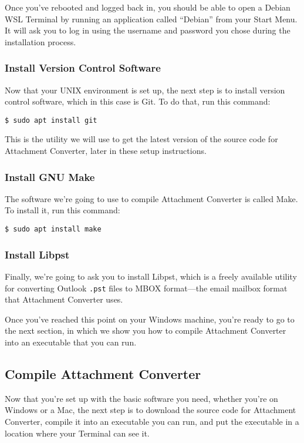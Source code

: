 \documentclass[11pt]{article}
\begin{document}
Once you've rebooted and logged back in, you should be able to open a
Debian WSL Terminal by running an application called ``Debian'' from
your Start Menu.  It will ask you to log in using the username and
password you chose during the installation process.

\subsubsection*{Install Version Control Software}
\label{sec:orgec6c2ca}

Now that your UNIX environment is set up, the next step is to install
version control software, which in this case is Git.  To do that, run
this command:

\begin{verbatim}
$ sudo apt install git
\end{verbatim}

This is the utility we will use to get the latest version of the
source code for Attachment Converter, later in these setup
instructions.

\subsubsection*{Install GNU Make}
\label{sec:orgef14f90}

The software we're going to use to compile Attachment Converter is
called Make.  To install it, run this command:

\begin{verbatim}
$ sudo apt install make
\end{verbatim}

\subsubsection*{Install Libpst}
\label{sec:org3405370}

Finally, we're going to ask you to install Libpst, which is a freely
available utility for converting Outlook \texttt{.pst} files to MBOX
format---the email mailbox format that Attachment Converter uses.

Once you've reached this point on your Windows machine, you're ready
to go to the next section, in which we show you how to compile
Attachment Converter into an executable that you can run.

\subsection*{Compile Attachment Converter \label{org8030e04}}
\label{sec:orgc34e73b}

Now that you're set up with the basic software you need, whether
you're on Windows or a Mac, the next step is to download the source
code for Attachment Converter, compile it into an executable you can
run, and put the executable in a location where your Terminal can see
it.
\end{document}

